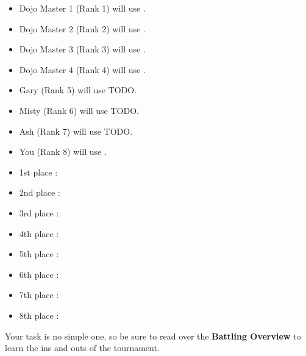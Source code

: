 \begin{multicols}{2}\small
\begin{itemize}
  \item Dojo Master 1 (Rank 1) will use \underline{\hspace{6em}}.
  \item Dojo Master 2 (Rank 2) will use \underline{\hspace{6em}}.
  \item Dojo Master 3 (Rank 3) will use \underline{\hspace{6em}}.
  \item Dojo Master 4 (Rank 4) will use \underline{\hspace{6em}}.
  \item Gary (Rank 5) will use TODO.
  \item Misty (Rank 6) will use TODO.
  \item Ash (Rank 7) will use TODO.
  \item You (Rank 8) will use \underline{\hspace{6em}}.
\end{itemize}
\begin{itemize}
  \item 1st place \mappMobimon{}: \underline{\hspace{10em}}
  \item 2nd place \mappMobimon{}: \underline{\hspace{10em}}
  \item 3rd place \mappMobimon{}: \underline{\hspace{10em}}
  \item 4th place \mappMobimon{}: \underline{\hspace{10em}}
  \item 5th place \mappMobimon{}: \underline{\hspace{10em}}
  \item 6th place \mappMobimon{}: \underline{\hspace{10em}}
  \item 7th place \mappMobimon{}: \underline{\hspace{10em}}
  \item 8th place \mappMobimon{}: \underline{\hspace{10em}}
\end{itemize}
\end{multicols}

Your task is no simple one, so be sure to read over the
\textbf{\mappMobimon{} Battling Overview} to learn the ins and outs
of the tournament.


